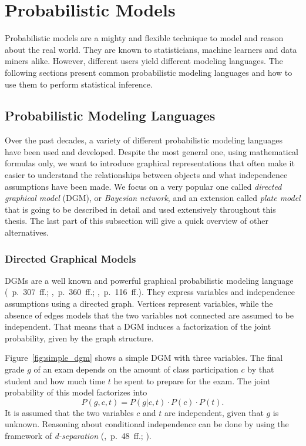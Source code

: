 \section{Probabilistic Models}

Probabilistic models are a mighty and flexible technique to model and reason about the real world. They are known to statisticians, machine learners and data miners alike. However, different users yield different modeling languages. The following sections present common probabilistic modeling languages and how to use them to perform statistical inference.

\subsection{Probabilistic Modeling Languages}

Over the past decades, a variety of different probabilistic modeling languages have been used and developed. Despite the most general one, using mathematical formulas only, we want to introduce graphical representations that often make it easier to understand the relationships between objects and what independence assumptions have been made. We focus on a very popular one called \emph{directed graphical model} (DGM), or \emph{Bayesian network}, and an extension called \emph{plate model} that is going to be described in detail and used extensively throughout this thesis. The last part of this subsection will give a quick overview of other alternatives.

\subsubsection{Directed Graphical Models}

DGMs are a well known and powerful graphical probabilistic modeling language (\cite{murphy2012machine}~p.~307~ff.; \cite{bishop2006pattern},~p.~360~ff.; \cite{pearl1988probabilistic},~p.~116~ff.). They express variables and independence assumptions using a directed graph. Vertices represent variables, while the absence of edges models that the two variables not connected are assumed to be independent. That means that a DGM induces a factorization of the joint probability, given by the graph structure.

Figure~\ref{fig:simple_dgm} shows a simple DGM with three variables. The final grade $g$ of an exam depends on the amount of class participation $c$ by that student and how much time $t$ he spent to prepare for the exam. The joint probability of this model factorizes into $$P(g,c,t) = P(g | c, t) \cdot P(c) \cdot P(t).$$ It is assumed that the two variables $c$ and $t$ are independent, given that $g$ is unknown. Reasoning about conditional independence can be done by using the framework of \emph{d-separation}  (\cite{lauritzen1996graphical},~p.~48~ff.; \cite{pearl1988probabilistic}).

